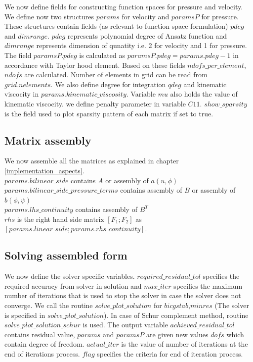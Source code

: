 \documentclass[a4paper,12pt]{book}
\begin{document}
We now define fields for constructing function spaces for pressure and velocity. We define now two structures $params$ for velocity and $paramsP$ for pressure. These structures contain fields (as relevant to function space formulation) $pdeg$ and $dimrange$. $pdeg$ represents polynomial degree of Ansatz function and $dimrange$ represents  dimension of qunatity i.e. 2 for velocity and 1 for pressure. The field $paramsP.pdeg$ is calculated as $paramsP.pdeg = params.pdeg - 1$ in accordance with Taylor hood element. Based on these fields $ndofs\_per\_element$, $ndofs$ are calculated. Number of elements in grid can be read from $grid.nelements$. We also define degree for integration $qdeg$ and kinematic viscocity in $params.kinematic\_viscosity$. Variable $mu$ also holds the value of kinematic viscocity. we define penalty parameter in variable $C11$. $show\_sparsity$ is the field used to plot sparsity pattern of each matrix if set to true.\\

\subsection{Matrix assembly}

We now assemble all the matrices as explained in chapter \ref{implementation_aspects}. \\$params.bilinear\_side$ contains $A$ or assembly of $a(u,\phi)$\\$params.bilinear\_side\_pressure\_terms$ contains assembly of $B$ or assembly of $b(\phi,\psi)$\\ $params.lhs\_continuity$ contains assembly of $B^T$\\ $rhs$ is the right hand side matrix $[F_1;F_2]$ as\\ $[params.linear\_side;params.rhs\_continuity]$. \\

\subsection{Solving assembled form}

We now define the solver specific variables. $required\_residual\_tol$ specifies the required accuracy from solver in solution and $max\_iter$ specifies the maximum number of iterations that is used to stop the solver in case the solver does not converge. We call the routine $solve\_plot\_solution$ for $bicgstab$,$minres$ (The solver is specified in $solve\_plot\_solution$). In case of Schur complement method, routine $solve\_plot\_solution\_schur$ is used. The output variable $achieved\_residual\_tol$ contains residual value, $params$ and $paramsP$ are given new values $dofs$ which contain degree of freedom. $actual\_iter$ is the value of number of iterations at the end of iterations process. $flag$ specifies the criteria for end of iteration process.\\
\end{document}
